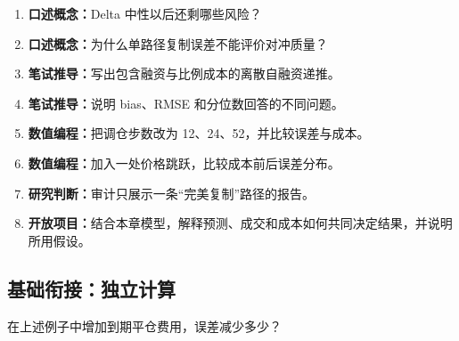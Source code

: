 \begin{enumerate}
  \item \textbf{口述概念：}Delta 中性以后还剩哪些风险？
  \item \textbf{口述概念：}为什么单路径复制误差不能评价对冲质量？
  \item \textbf{笔试推导：}写出包含融资与比例成本的离散自融资递推。
  \item \textbf{笔试推导：}说明 bias、RMSE 和分位数回答的不同问题。
  \item \textbf{数值编程：}把调仓步数改为 12、24、52，并比较误差与成本。
  \item \textbf{数值编程：}加入一处价格跳跃，比较成本前后误差分布。
  \item \textbf{研究判断：}审计只展示一条“完美复制”路径的报告。
  \item \textbf{开放项目：}结合本章模型，解释预测、成交和成本如何共同决定结果，并说明所用假设。
\end{enumerate}

\subsection*{基础衔接：独立计算}
在上述例子中增加到期平仓费用，误差减少多少？
